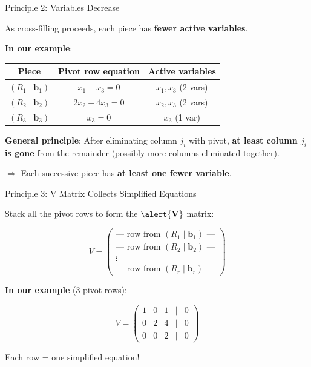 \documentclass[10pt]{beamer}
\theoremstyle{definition}
\newcommand{\x}[1]{\alert{\textbf{#1}}}
\begin{document}
\begin{frame}{Principle 2: Variables Decrease}

As cross-filling proceeds, each piece has \textbf{fewer active variables}.

\vspace{1em}

\x{In our example}:

\begin{center}
\begin{tabular}{|c|c|c|}
\hline
\textbf{Piece} & \textbf{Pivot row equation} & \textbf{Active variables} \\
\hline
$(R_1 \mid \mathbf{b}_1)$ & $x_1 + x_3 = 0$ & $x_1, x_3$ (2 vars) \\
\hline
$(R_2 \mid \mathbf{b}_2)$ & $2x_2 + 4x_3 = 0$ & $x_2, x_3$ (2 vars) \\
\hline
$(R_3 \mid \mathbf{b}_3)$ & $x_3 = 0$ & $x_3$ (1 var) \\
\hline
\end{tabular}
\end{center}

\vspace{1em}

\x{General principle}: After eliminating column $j_i$ with pivot, \textbf{at least column $j_i$ is gone} from the remainder (possibly more columns eliminated together).

\vspace{0.5em}

$\Rightarrow$ Each successive piece has \textbf{at least one fewer variable}.

\end{frame}

\begin{frame}{Principle 3: V Matrix Collects Simplified Equations}

Stack all the pivot rows to form the $\x{V}$ matrix:

$$V = \begin{pmatrix}
\text{— row from } (R_1 \mid \mathbf{b}_1) \text{ —} \\
\text{— row from } (R_2 \mid \mathbf{b}_2) \text{ —} \\
\vdots \\
\text{— row from } (R_r \mid \mathbf{b}_r) \text{ —}
\end{pmatrix}$$

\vspace{1em}

\x{In our example} (3 pivot rows):

$$V = \begin{pmatrix}
1 & 0 & 1 & \mid & 0 \\
0 & 2 & 4 & \mid & 0 \\
0 & 0 & 2 & \mid & 0
\end{pmatrix}$$

\vspace{0.5em}

Each row = one simplified equation!

\end{frame}
\end{document}
